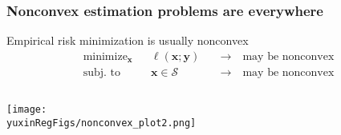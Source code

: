 \documentclass[compress,
mathserif,wide,%
]{beamer}
\newcommand{\yuxinRegFigs}{figure}
\begin{document}
\begin{frame}
\frametitle{Nonconvex estimation problems are everywhere}

  Empirical risk minimization  is usually nonconvex
  \begin{align*}
    \text{minimize}_{\bm{x}} &  & \ell(\bm{x};\bm{y}) \quad  & \rightarrow \quad \text{may be nonconvex} \\
    \text{subj.~to} &  & \bm{x} \in \mathcal{S}  \quad    & \rightarrow \quad \text{may be nonconvex}
  \end{align*}
  

  \begin{columns}

  \begin{column}{0.4\textwidth}
    \texttt{[image: \\yuxinRegFigs/nonconvex\_plot2.png]}
  \end{column}
 
  \end{columns}

\end{frame}
\end{document}
